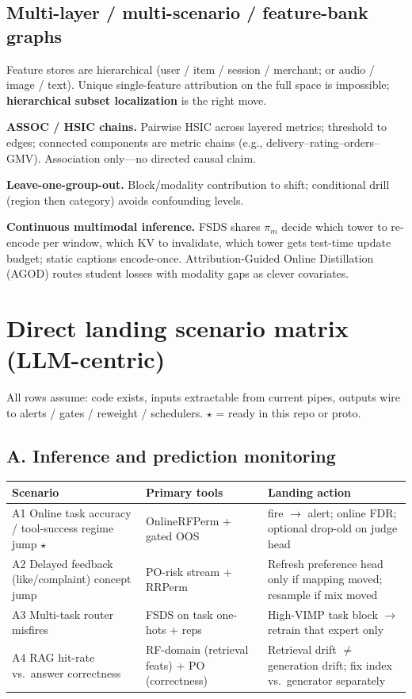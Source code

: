 \documentclass[11pt,a4paper]{article}
\begin{document}
\subsection{Multi-layer / multi-scenario / feature-bank graphs}
Feature stores are hierarchical (user / item / session / merchant; or audio / image / text). Unique single-feature attribution on the full space is impossible; \textbf{hierarchical subset localization} is the right move.

\textbf{ASSOC / HSIC chains.} Pairwise HSIC across layered metrics; threshold to edges; connected components are metric chains (e.g., delivery--rating--orders--GMV). Association only---no directed causal claim.

\textbf{Leave-one-group-out.} Block/modality contribution to shift; conditional drill (region then category) avoids confounding levels.

\textbf{Continuous multimodal inference.} FSDS shares \(\pi_m\) decide which tower to re-encode per window, which KV to invalidate, which tower gets test-time update budget; static captions encode-once. Attribution-Guided Online Distillation (AGOD) routes student losses with modality gaps as clever covariates.

\section{Direct landing scenario matrix (LLM-centric)}
\label{sec:scenarios}

All rows assume: code exists, inputs extractable from current pipes, outputs wire to alerts / gates / reweight / schedulers. \(\star\) = ready in this repo or proto.

\subsection{A. Inference and prediction monitoring}
\begin{longtable}{@{}p{3.2cm}p{3.4cm}p{5.6cm}@{}}
\toprule
Scenario & Primary tools & Landing action \\
\midrule
\endhead
A1 Online task accuracy / tool-success regime jump \(\star\) &
OnlineRFPerm + gated OOS &
fire \(\to\) alert; online FDR; optional drop-old on judge head \\
A2 Delayed feedback (like/complaint) concept jump &
PO-risk stream + RRPerm &
Refresh preference head only if mapping moved; resample if mix moved \\
A3 Multi-task router misfires &
FSDS on task one-hots + reps &
High-VIMP task block \(\to\) retrain that expert only \\
A4 RAG hit-rate vs.\ answer correctness &
RF-domain (retrieval feats) + PO (correctness) &
Retrieval drift \(\neq\) generation drift; fix index vs.\ generator separately \\
\bottomrule
\end{longtable}
\end{document}
